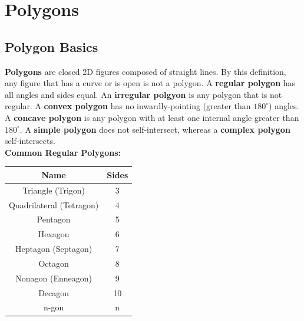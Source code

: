 \section{Polygons}

    \subsection{Polygon Basics}
        \textbf{Polygons} are closed 2D figures composed of straight lines. By this definition,
        any figure that has a curve or is open is not a polygon. A \textbf{regular polygon} has
        all angles and sides equal. An \textbf{irregular polgyon} is any polygon that is not
        regular. A \textbf{convex polygon} has no inwardly-pointing (greater than $180^\circ$)
        angles. A \textbf{concave polygon} is any polygon with at least one internal angle
        greater than $180^\circ$. A \textbf{simple polygon} does not self-intersect, whereas a
        \textbf{complex polygon} self-intersects. \\

        \noindent \color{purple} \textbf{Common Regular Polygons:} \color{black} \\

        \begin{center}
            \begin{tabular}{|c|c|}
                \hline
                \textbf{Name} & \textbf{Sides} \\
                \hline
                Triangle (Trigon) & 3 \\
                \hline
                Quadrilateral (Tetragon) & 4 \\
                \hline
                Pentagon & 5 \\
                \hline
                Hexagon & 6 \\
                \hline
                Heptagon (Septagon) & 7 \\
                \hline
                Octagon & 8 \\
                \hline
                Nonagon (Enneagon) & 9 \\
                \hline
                Decagon & 10 \\
                \hline
                n-gon & n \\
                \hline
            \end{tabular}
        \end{center}

